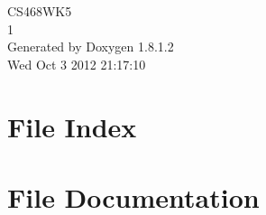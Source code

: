 \documentclass{book}
\begin{document}
\hypersetup{pageanchor=false,citecolor=blue}
\begin{titlepage}
\vspace*{7cm}
\begin{center}
{\Large C\-S468\-W\-K5 \\[1ex]\large 1 }\\
\vspace*{1cm}
{\large Generated by Doxygen 1.8.1.2}\\
\vspace*{0.5cm}
{\small Wed Oct 3 2012 21:17:10}\\
\end{center}
\end{titlepage}
\clearemptydoublepage
{}
\tableofcontents
\clearemptydoublepage
{}
\hypersetup{pageanchor=true,citecolor=blue}
\chapter{File Index}

\chapter{File Documentation}












\printindex
\end{document}
